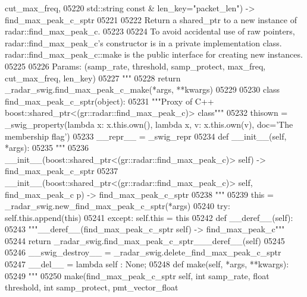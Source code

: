 \begin{DoxyCode}
{{{{{{{{{{{{{{{{{{{       cut\_max\_freq, }
05220 \textcolor{stringliteral}{        std::string const & len\_key="packet\_len") -> find\_max\_peak\_c\_sptr}
05221 \textcolor{stringliteral}{}
05222 \textcolor{stringliteral}{    Return a shared\_ptr to a new instance of radar::find\_max\_peak\_c.}
05223 \textcolor{stringliteral}{}
05224 \textcolor{stringliteral}{    To avoid accidental use of raw pointers, radar::find\_max\_peak\_c's constructor is in a private
       implementation class. radar::find\_max\_peak\_c::make is the public interface for creating new instances.}
05225 \textcolor{stringliteral}{}
05226 \textcolor{stringliteral}{    Params: (samp\_rate, threshold, samp\_protect, max\_freq, cut\_max\_freq, len\_key)}
05227 \textcolor{stringliteral}{    """}
05228   \textcolor{keywordflow}{return} \_radar\_swig.find\_max\_peak\_c\_make(*args, **kwargs)
05229 
05230 \textcolor{keyword}{class }find_max_peak_c_sptr(object):
05231     \textcolor{stringliteral}{"""Proxy of C++ boost::shared\_ptr<(gr::radar::find\_max\_peak\_c)> class"""}
05232     thisown = _swig_property(\textcolor{keyword}{lambda} x: x.this.own(), \textcolor{keyword}{lambda} x, v: x.this.own(v), doc=\textcolor{stringliteral}{'The membership flag'})
05233     \_\_repr\_\_ = \_swig\_repr
05234     \textcolor{keyword}{def }__init__(self, *args): 
05235         \textcolor{stringliteral}{"""}
05236 \textcolor{stringliteral}{        \_\_init\_\_(boost::shared\_ptr<(gr::radar::find\_max\_peak\_c)> self) -> find\_max\_peak\_c\_sptr}
05237 \textcolor{stringliteral}{        \_\_init\_\_(boost::shared\_ptr<(gr::radar::find\_max\_peak\_c)> self, find\_max\_peak\_c p) ->
       find\_max\_peak\_c\_sptr}
05238 \textcolor{stringliteral}{        """}
05239         this = \_radar\_swig.new\_find\_max\_peak\_c\_sptr(*args)
05240         \textcolor{keywordflow}{try}: self.this.append(this)
05241         \textcolor{keywordflow}{except}: self.this = this
05242     \textcolor{keyword}{def }__deref__(self):
05243         \textcolor{stringliteral}{"""\_\_deref\_\_(find\_max\_peak\_c\_sptr self) -> find\_max\_peak\_c"""}
05244         \textcolor{keywordflow}{return} \_radar\_swig.find\_max\_peak\_c\_sptr\_\_\_deref\_\_(self)
05245 
05246     \_\_swig\_destroy\_\_ = \_radar\_swig.delete\_find\_max\_peak\_c\_sptr
05247     \_\_del\_\_ = \textcolor{keyword}{lambda} self : \textcolor{keywordtype}{None};
05248     \textcolor{keyword}{def }make(self, *args, **kwargs):
05249         \textcolor{stringliteral}{"""}
05250 \textcolor{stringliteral}{        make(find\_max\_peak\_c\_sptr self, int samp\_rate, float threshold, int samp\_protect, pmt\_vector\_float
}}}}}}}}}}}}}}}}}}}
\end{DoxyCode}
